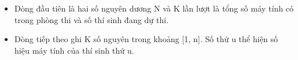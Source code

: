 \begin{itemize}
	\item     Dòng đầu tiên là hai số nguyên dương N và K lần lượt là tổng số máy tính có trong phòng thi và số thí sinh đang dự thi.   
	\item     Dòng tiếp theo ghi K số nguyên trong khoảng [1, n]. Số thứ u thể hiện số hiệu máy tính của thí sinh thứ u.   
\end{itemize}
